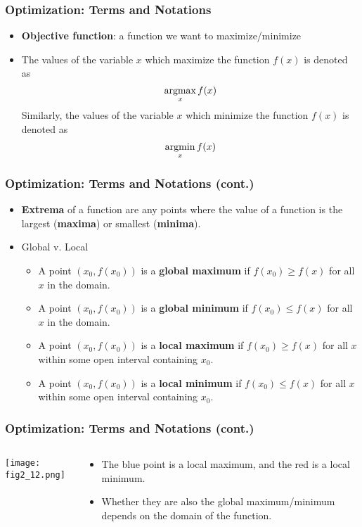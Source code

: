 \documentclass[pdflatex, 12pt]{beamer}
\begin{document}
\begin{frame}
\frametitle{Optimization: Terms and Notations}
\begin{itemize}
\item \textbf{Objective function}: a function we want to maximize/minimize
\vspace{0.4cm}
\item The values of the variable $x$ which maximize the function $f(x)$ is denoted as 
 \begin{equation}
 \operatorname*{argmax}_x f(x) \notag
 \end{equation}
Similarly, the values of the variable $x$ which minimize the function $f(x)$ is denoted as
 \begin{equation}
 \operatorname*{argmin}_x f(x) \notag
 \end{equation}
\end{itemize}
\end{frame}

\begin{frame}
\frametitle{Optimization: Terms and Notations (cont.)}
\begin{itemize}
\item \textbf{Extrema} of a function are any points where the value of a function is the largest (\textbf{maxima}) or smallest (\textbf{minima}).
\vspace{0.4cm}
\item Global v. Local
 \begin{itemize}
 \item A point $(x_0, f(x_0))$ is a \textbf{global maximum} if $f(x_0) \geq f(x)$ for all $x$ in the domain.
 \item A point $(x_0, f(x_0))$ is a \textbf{global minimum} if $f(x_0) \leq f(x)$ for all $x$ in the domain.
 \item A point $(x_0, f(x_0))$ is a \textbf{local maximum} if $f(x_0) \geq f(x)$ for all $x$ within some open interval containing $x_0$.
 \item A point $(x_0, f(x_0))$ is a \textbf{local minimum} if $f(x_0) \leq f(x)$ for all $x$ within some open interval containing $x_0$.
 \end{itemize}
\end{itemize}
\end{frame}

\begin{frame}
\frametitle{Optimization: Terms and Notations (cont.)}
\begin{columns}
\begin{column}{0.5\textwidth}
\centering
\texttt{[image: fig2\_12.png]}
\end{column}
\begin{column}{0.5\textwidth}
\begin{itemize}
\item The blue point is a local maximum, and the red is a local minimum.
\vspace{0.4cm}
\item Whether they are also the global maximum/minimum depends on the domain of the function. 
\end{itemize}
\end{column}
\end{columns}
\end{frame}
\end{document}
